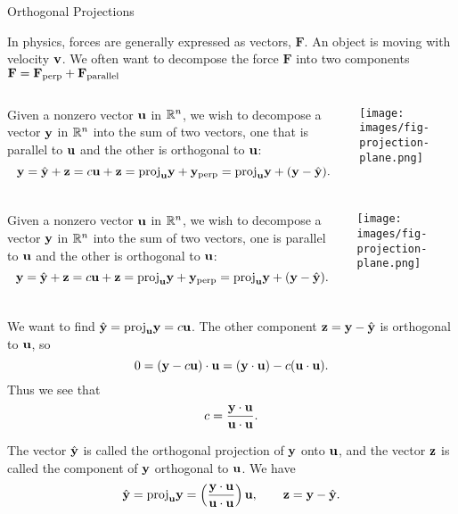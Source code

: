 \documentclass[xcolor=dvipsnames,aspectratio=169,t]{beamer}
\begin{document}
\begin{frame}{Orthogonal Projections}
  \bigskip

  \bi
  \ii In physics, forces are generally expressed as vectors, $\mathbf{F}$.
  \ii An object is moving with velocity $\mathbf{v}$.
  \ii We often want to decompose the force $\mathbf{F}$ into two components $\mathbf{F} = \mathbf{F}_{\rm perp} + \mathbf{F}_{\rm parallel}$
  \ei
  \vspace*{1.5em}

  \begin{columns}[T]

  \column{0.7\tw}

  Given a nonzero vector $\mathbf{u}$ in $\mathbb{R}^n$, we wish to decompose a vector $\mathbf{y}$ in $\mathbb{R}^n$ into the sum of two vectors, one that is \alert{parallel} to $\mathbf{u}$ and the other is \alert{orthogonal} to $\mathbf{u}$:
  \[ \mathbf{y} = \hat{\mathbf{y}} + \mathbf{z} = c \mathbf{u} + \mathbf{z} =  \mbox{proj}_{\mathbf{u}} \mathbf{y} + \mathbf{y}_{\rm perp} = \mbox{proj}_{\mathbf{u}} \mathbf{y} + (\mathbf{y} - \hat{\mathbf{y}}) .\]

  \column{0.3\tw}
  \texttt{[image: images/fig-projection-plane.png]}

  \end{columns}
\end{frame}

\begin{frame}
  \vspace*{-.7em}

  \begin{columns}[T]
  \column{0.7\tw}
  Given a nonzero vector $\mathbf{u}$ in $\mathbb{R}^n$, we wish to decompose a vector $\mathbf{y}$ in $\mathbb{R}^n$ into the sum of two vectors, one is parallel to $\mathbf{u}$ and the other is orthogonal to $\mathbf{u}$:
  \[ \mathbf{y} = \hat{\mathbf{y}} + \mathbf{z} = c \mathbf{u} + \mathbf{z} =  \mbox{proj}_{\mathbf{u}} \mathbf{y} + \mathbf{y}_{\rm perp} = \mbox{proj}_{\mathbf{u}} \mathbf{y} + (\mathbf{y} - \hat{\mathbf{y}}) .\]

  \column{0.3\tw}
  \texttt{[image: images/fig-projection-plane.png]}
  \end{columns}

  We want to find $\hat{\mathbf{y}} = \mbox{proj}_{\mathbf{u}} \mathbf{y}= c\mathbf{u}$. 
  \pause
  The other component $\mathbf{z} = \mathbf{y} - \hat{\mathbf{y}}$ is \alert{orthogonal} to $\mathbf{u}$, so
  \[ 0 = (\mathbf{y} - c\mathbf{u}) \cdot \mathbf{u} = (\mathbf{y} \cdot \mathbf{u}) - c( \mathbf{u} \cdot \mathbf{u}) .\]
  \pause
  Thus we see that 
  \[ c = \frac{\mathbf{y} \cdot \mathbf{u}}{\mathbf{u} \cdot \mathbf{u}}. \]

  \pause
  \begin{definition}
    The vector $\hat{\mathbf{y}}$ is called the \alert{orthogonal projection of $\mathbf{y}$ onto $\mathbf{u}$}, and the vector $\mathbf{z}$ is called the \alert{component of $\mathbf{y}$ orthogonal to $\mathbf{u}$}. We have 
    \[ \hat{\mathbf{y}} =  \mbox{proj}_{\mathbf{u}} \mathbf{y} =  \left( \frac{\mathbf{y} \cdot \mathbf{u}}{\mathbf{u} \cdot \mathbf{u}} \right) \mathbf{u}, \qquad \mathbf{z} = \mathbf{y} - \hat{\mathbf{y}}.\]
  \end{definition}
\end{frame}
\end{document}
